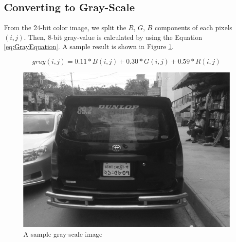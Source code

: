 \documentclass{standalone}
\begin{document}
\subsection{Converting to Gray-Scale}
From the 24-bit color image, we split the $R$, $G$, $B$ components of each pixels $(i, j)$. Then, 8-bit gray-value is calculated by using the Equation \ref{eq:GrayEquation}. A sample result is shown in Figure \ref{fig:GraySample}.

\begin{equation}\label{eq:GrayEquation}
gray(i, j) = 0.11 * B(i, j) + 0.30 * G(i, j) + 0.59 * R(i, j)
\end{equation}

\begin{figure}
	\centering
	\includegraphics[width=.8\linewidth]{./img/sample/stage1.jpg}
	\caption{A sample gray-scale image} 
	 \label{fig:GraySample}
\end{figure}
\end{document}
